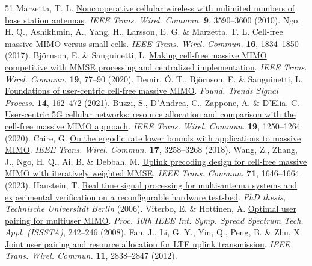 \documentclass[10pt,letterpaper]{article}
\begin{document}
\clearpage
\renewcommand{\refname}{Supplementary References}
\begin{thebibliography}{51}\small
{} Marzetta, T. L. \href{https://doi.org/10.1109/TWC.2010.092810.091092}{Noncooperative cellular wireless with unlimited numbers of base station antennas}. \emph{IEEE Trans. Wirel. Commun.} \textbf{9}, 3590–3600 (2010).
 Ngo, H. Q., Ashikhmin, A., Yang, H., Larsson, E. G. \& Marzetta, T. L. \href{https://doi.org/10.1109/TWC.2017.2655515}{Cell-free massive MIMO versus small cells}. \emph{IEEE Trans. Wirel. Commun.} \textbf{16}, 1834–1850 (2017).
 Björnson, E. \& Sanguinetti, L. \href{https://doi.org/10.1109/TWC.2019.2941478}{Making cell-free massive MIMO competitive with MMSE processing and centralized implementation}. \emph{IEEE Trans. Wirel. Commun.} \textbf{19}, 77–90 (2020).
 Demir, Ö. T., Björnson, E. \& Sanguinetti, L. \href{https://doi.org/10.1561/2000000109}{Foundations of user-centric cell-free massive MIMO}. \emph{Found. Trends Signal Process.} \textbf{14}, 162–472 (2021).
 Buzzi, S., D’Andrea, C., Zappone, A. \& D’Elia, C. \href{https://doi.org/10.1109/TWC.2019.2952117}{User-centric 5G cellular networks: resource allocation and comparison with the cell-free massive MIMO approach}. \emph{IEEE Trans. Wirel. Commun.} \textbf{19}, 1250–1264 (2020).
 Caire, G. \href{https://doi.org/10.1109/TWC.2018.2808522}{On the ergodic rate lower bounds with applications to massive MIMO}. \emph{IEEE Trans. Wirel. Commun.} \textbf{17}, 3258–3268 (2018).
 Wang, Z., Zhang, J., Ngo, H. Q., Ai, B. \& Debbah, M. \href{https://doi.org/10.1109/TCOMM.2023.3235919}{Uplink precoding design for cell-free massive MIMO with iteratively weighted MMSE}. \emph{IEEE Trans. Commun.} \textbf{71}, 1646–1664 (2023).
 Haustein, T. \href{https://edocs.tib.eu/files/e01dd01/522593321.pdf}{Real time signal processing for multi-antenna systems and experimental verification on a reconfigurable hardware test-bed}. \emph{PhD thesis, Technische Universität Berlin} (2006).
 Viterbo, E. \& Hottinen, A. \href{https://doi.org/10.1109/ISSSTA.2008.50}{Optimal user pairing for multiuser MIMO}. \emph{Proc. 10th IEEE Int. Symp. Spread Spectrum Tech. Appl. (ISSSTA)}, 242–246 (2008).
 Fan, J., Li, G. Y., Yin, Q., Peng, B. \& Zhu, X. \href{https://doi.org/10.1109/TWC.2012.070912.111305}{Joint user pairing and resource allocation for LTE uplink transmission}. \emph{IEEE Trans. Wirel. Commun.} \textbf{11}, 2838–2847 (2012).

\end{thebibliography}
\end{document}
